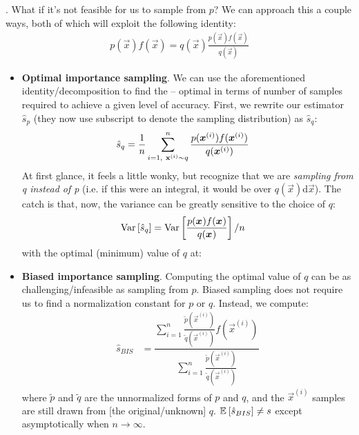 \documentclass[11pt]{article}
\begin{document}
\myspace
\p {}. What if it's not feasible for us to sample from $p$? We can approach this a couple ways, both of which will exploit the following identity:
\begin{align}
	p(\vec{x}) f(\vec{x}) = q(\vec{x}) \frac{p(\vec{x}) f(\vec{x})}{q(\vec{x})}
\end{align}
\begin{itemize}
	\item \textbf{Optimal importance sampling}. We can use the aforementioned identity/decomposition to find the  -- optimal in terms of number of samples required to achieve a given level of accuracy. First, we rewrite our estimator $\hat{s}_p$ (they now use subscript to denote the sampling distribution) as $\hat{s}_q$:
	\begin{align}
		\hat{s}_q &=  \frac{1}{n} \sum_{i = 1,~\mathbf{x}_{}^{(i)} \sim q}^{n} \frac{p(\bm{x}_{}^{(i)}) f(\bm{x}_{}^{(i)})}{q(\bm{x}_{}^{(i)})}
	\end{align}
	At first glance, it feels a little wonky, but recognize that we are \textit{sampling from q instead of p} (i.e. if this were an integral, it would be over $q(\vec{x})\mathrm{d}\vec{x}$). The catch is that, now, the variance can be greatly sensitive to the choice of $q$:
	\begin{align}
		\mathrm{Var}\left[\hat{s}_q\right] &= \mathrm{Var}\left[\frac{p(\bm{x}_{}) f(\bm{x}_{})}{q(\bm{x}_{})}\right] / n
	\end{align}
	with the optimal (minimum) value of $q$ at:
		
	\item \textbf{Biased importance sampling}. Computing the optimal value of $q$ can be as challenging/infeasible as sampling from $p$. Biased sampling does not require us to find a normalization constant for $p$ or $q$. Instead, we compute:
	\begin{align}
		\hat{s}_{BIS} &= \dfrac{
			\sum_{i = 1}^{n} \frac{\tilde p(\vec{x}^{(i)})}{\tilde q(\vec{x}^{(i)})}  f(\vec{x}^{(i)})
			}{
			\sum_{i = 1}^{n} \frac{\tilde p(\vec{x}^{(i)})}{\tilde q(\vec{x}^{(i)})}  
			}
	\end{align}
	where $\tilde p$ and $\tilde q$ are the unnormalized forms of $p$ and $q$, and the $\vec{x}^{(i)}$ samples are still drawn from [the original/unknown] $q$. $\mathbb{E}_{}\left[\hat s_{BIS}\right] \ne s$ except asymptotically when $n \rightarrow \infty$. 
\end{itemize}
\end{document}
